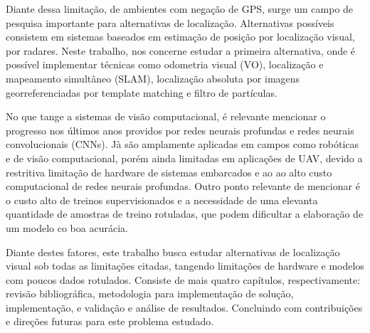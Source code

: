 Diante dessa limitação, de ambientes com negação de GPS, surge um campo de pesquisa importante para alternativas de localização. Alternativas possíveis consistem em sistemas baseados em estimação de posição por localização visual, por radares. Neste trabalho, nos concerne estudar a primeira alternativa, onde é possível implementar técnicas como odometria visual (VO), localização e mapeamento simultâneo (SLAM), localização absoluta por imagens georreferenciadas por template matching e filtro de partículas.

No que tange a sistemas de visão computacional, é relevante mencionar o progresso nos últimos anos providos por redes neurais profundas e redes neurais convolucionais (CNNs). Jà são amplamente aplicadas em campos como robóticas e de visão computacional, porém ainda limitadas em aplicações de UAV, devido a restritiva limitação de hardware de sistemas embarcados e ao ao alto custo computacional de redes neurais profundas. Outro ponto relevante de mencionar é o custo alto de treinos supervisionados e a necessidade de uma elevanta quantidade de amostras de treino rotuladas, que podem dificultar a elaboração de um modelo co boa acurácia.

Diante destes fatores, este trabalho busca estudar alternativas de localização visual sob todas as limitações citadas, tangendo limitações de hardware e modelos com poucos dados rotulados. Consiste de mais quatro capítulos, respectivamente: revisão bibliográfica, metodologia para implementação de solução, implementação, e validação e análise de resultados. Concluindo com contribuições e direções futuras para este problema estudado.
